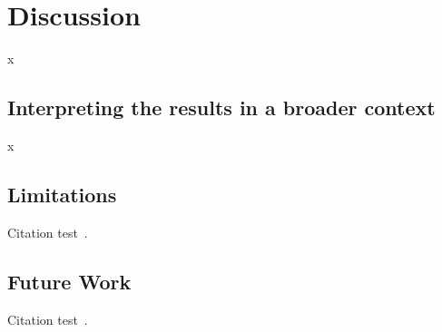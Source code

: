 
\chapter{Discussion}\label{chapter:discussion}
x

\section{Interpreting the results in a broader context}
x

\section{Limitations}
Citation test~\parencite{latex}.

\section{Future Work}\label{section:future_work}
Citation test~\parencite{latex}.
